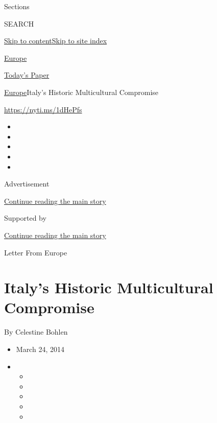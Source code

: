 Sections

SEARCH

\protect\hyperlink{site-content}{Skip to
content}\protect\hyperlink{site-index}{Skip to site index}

\href{https://www.nytimes3xbfgragh.onion/section/world/europe}{Europe}

\href{https://myaccount.nytimes3xbfgragh.onion/auth/login?response_type=cookie\&client_id=vi}{}

\href{https://www.nytimes3xbfgragh.onion/section/todayspaper}{Today's
Paper}

\href{/section/world/europe}{Europe}\textbar{}Italy's Historic
Multicultural Compromise

\url{https://nyti.ms/1dHePfs}

\begin{itemize}
\item
\item
\item
\item
\item
\end{itemize}

Advertisement

\protect\hyperlink{after-top}{Continue reading the main story}

Supported by

\protect\hyperlink{after-sponsor}{Continue reading the main story}

Letter From Europe

\hypertarget{italys-historic-multicultural-compromise}{%
\section{Italy's Historic Multicultural
Compromise}\label{italys-historic-multicultural-compromise}}

By Celestine Bohlen

\begin{itemize}
\item
  March 24, 2014
\item
  \begin{itemize}
  \item
  \item
  \item
  \item
  \item
  \end{itemize}
\end{itemize}

